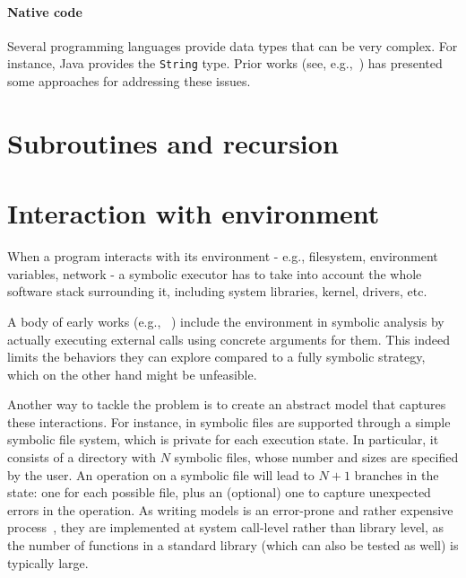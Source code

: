 \paragraph{Native code} Several programming languages provide data types that can be very complex. For instance, Java provides the {\tt String} type. Prior works (see, e.g.,~\cite{SHZ-TAIC07}) has presented some approaches for addressing these issues.


\section{Subroutines and recursion}
\label{se:recursion}


\section{Interaction with environment}

When a program interacts with its environment - e.g., filesystem, environment variables, network - a symbolic executor has to take into account the whole software stack surrounding it, including system libraries, kernel, drivers, etc.

A body of early works (e.g., ~\cite{DART-PLDI05,CUTE-FSE13,EXE-CCS06}) include the environment in symbolic analysis by actually executing external calls using concrete arguments for them. This indeed limits the behaviors they can explore compared to a fully symbolic strategy, which on the other hand might be unfeasible.

Another way to tackle the problem is to create an abstract model that captures these interactions. For instance, in \cite{KLEE-OSDI08} symbolic files are supported through a simple symbolic file system, which is private for each execution state. In particular, it consists of a directory with $N$ symbolic files, whose number and sizes are specified by the user. An operation on a symbolic file will lead to $N+1$ branches in the state: one for each possible file, plus an (optional) one to capture unexpected errors in the operation. As writing models is an error-prone and rather expensive process~\cite{Ball06}, they are implemented at system call-level rather than library level, as the number of functions in a standard library (which can also be tested as well) is typically large.



